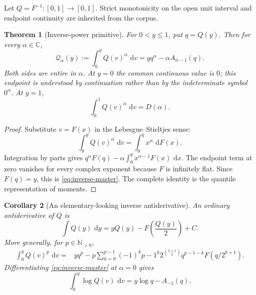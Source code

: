 \documentclass[11pt,oneside]{article}
\numberwithin{equation}{section}
\newtheorem{theorem}{Theorem}[section]
\newtheorem{corollary}[theorem]{Corollary}
\theoremstyle{definition}
\theoremstyle{remark}
\newcommand{\C}{\mathbb C}
\newcommand{\N}{\mathbb N}
\newcommand{\dd}{\,\mathrm d}
\newcommand{\fall}[2]{#1^{\underline{#2}}}
\begin{document}
Let $Q=F^{-1}:[0,1]\to[0,1]$.  Strict monotonicity on the open unit interval and endpoint
continuity are inherited from the corpus.

\begin{theorem}[Inverse-power primitive]
\label{thm:inverse-master}
For $0<y\le1$, put $q=Q(y)$.  Then for every $\alpha\in\C$,
\begin{equation}
 \boxed{
 \mathcal Q_\alpha(y):=\int_0^yQ(v)^\alpha\,\dd v
 =yq^\alpha-\alpha A_{\alpha-1}(q).}
 \label{eq:inverse-master}
\end{equation}
Both sides are entire in $\alpha$.  At $y=0$ the common continuous value is $0$; this endpoint is understood by continuation rather than by the indeterminate symbol $0^\alpha$.  At $y=1$,
\begin{equation}
 \int_0^1Q(v)^\alpha\,\dd v=D(\alpha).                       \label{eq:inverse-complete}
\end{equation}
\end{theorem}

\begin{proof}
Substitute $v=F(x)$ in the Lebesgue--Stieltjes sense:
\[
 \int_0^yQ(v)^\alpha\,\dd v=\int_0^qx^\alpha\,\dd F(x).
\]
Integration by parts gives $q^\alpha F(q)-\alpha\int_0^qx^{\alpha-1}F(x)\,\dd x$.
The endpoint term at zero vanishes for every complex exponent because $F$ is infinitely
flat.  Since $F(q)=y$, this is \eqref{eq:inverse-master}.  The complete identity is the
quantile representation of moments.
\end{proof}

\begin{corollary}[An elementary-looking inverse antiderivative]
\label{cor:inverse-one}
An ordinary antiderivative of $Q$ is
\begin{equation}
 \boxed{
 \int Q(y)\,\dd y
 =yQ(y)-F\!\left(\frac{Q(y)}2\right)+C.}
 \label{eq:inverse-one}
\end{equation}
More generally, for $p\in\N_{>0}$,
\begin{align}
 \int_0^yQ(v)^p\,\dd v
 ={}&yq^p
 -p\sum_{k=0}^{p-1}(-1)^k\fall{p-1}k
 2^{\binom{k+1}{2}}q^{p-1-k}F(q/2^{k+1}).                   \label{eq:inverse-integer}
\end{align}
Differentiating \eqref{eq:inverse-master} at $\alpha=0$ gives
\begin{equation}
 \int_0^y\log Q(v)\,\dd v=y\log q-A_{-1}(q).                \label{eq:inverse-log}
\end{equation}
\end{corollary}
\end{document}
